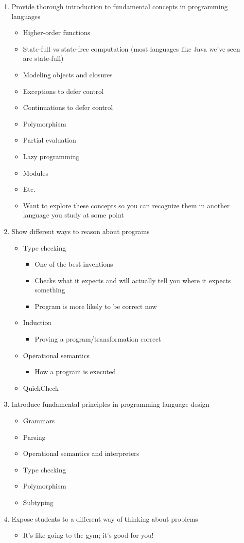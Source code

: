 \documentclass[11pt]{article}
\begin{document}
\begin{enumerate}
\item Provide thorough introduction to fundamental concepts in programming languages
\begin{itemize}
\item Higher-order functions
\item State-full vs state-free computation (most languages like Java we've seen are state-full)
\item Modeling objects and closures
\item Exceptions to defer control
\item Continuations to defer control
\item Polymorphism
\item Partial evaluation
\item Lazy programming
\item Modules
\item Etc.
\item Want to explore these concepts so you can recognize them in another language you study at some point
\end{itemize}
\item Show different ways to reason about programs
\begin{itemize}
\item Type checking
\begin{itemize}
\item One of the best inventions
\item Checks what it expects and will actually tell you where it expects something
\item Program is more likely to be correct now
\end{itemize}
\item Induction
\begin{itemize}
\item Proving a program/transformation correct
\end{itemize}
\item Operational semantics
\begin{itemize}
\item How a program is executed
\end{itemize}
\item QuickCheck
\end{itemize}
\item Introduce fundamental principles in programming language design
\begin{itemize}
\item Grammars
\item Parsing
\item Operational semantics and interpreters
\item Type checking
\item Polymorphism
\item Subtyping
\end{itemize}
\item Expose students to a different way of thinking about problems
\begin{itemize}
\item It's like going to the gym; it's good for you!
\end{itemize}
\end{enumerate}
\end{document}
